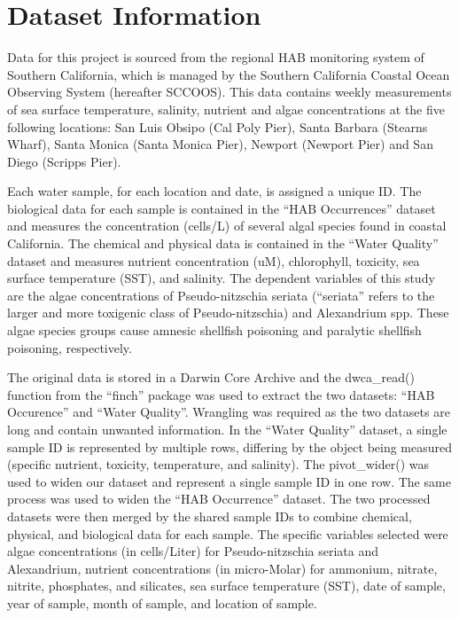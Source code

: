 \documentclass[
  12pt,
]{article}
\begin{document}
\newpage

\hypertarget{dataset-information}{%
\section{Dataset Information}\label{dataset-information}}

Data for this project is sourced from the regional HAB monitoring system
of Southern California, which is managed by the Southern California
Coastal Ocean Observing System (hereafter SCCOOS). This data contains
weekly measurements of sea surface temperature, salinity, nutrient and
algae concentrations at the five following locations: San Luis Obsipo
(Cal Poly Pier), Santa Barbara (Stearns Wharf), Santa Monica (Santa
Monica Pier), Newport (Newport Pier) and San Diego (Scripps Pier).

Each water sample, for each location and date, is assigned a unique ID.
The biological data for each sample is contained in the ``HAB
Occurrences'' dataset and measures the concentration (cells/L) of
several algal species found in coastal California. The chemical and
physical data is contained in the ``Water Quality'' dataset and measures
nutrient concentration (uM), chlorophyll, toxicity, sea surface
temperature (SST), and salinity. The dependent variables of this study
are the algae concentrations of Pseudo-nitzschia seriata (``seriata''
refers to the larger and more toxigenic class of Pseudo-nitzschia) and
Alexandrium spp. These algae species groups cause amnesic shellfish
poisoning and paralytic shellfish poisoning, respectively.

The original data is stored in a Darwin Core Archive and the
dwca\_read() function from the ``finch'' package was used to extract the
two datasets: ``HAB Occurence'' and ``Water Quality''. Wrangling was
required as the two datasets are long and contain unwanted information.
In the ``Water Quality'' dataset, a single sample ID is represented by
multiple rows, differing by the object being measured (specific
nutrient, toxicity, temperature, and salinity). The pivot\_wider() was
used to widen our dataset and represent a single sample ID in one row.
The same process was used to widen the ``HAB Occurrence'' dataset. The
two processed datasets were then merged by the shared sample IDs to
combine chemical, physical, and biological data for each sample. The
specific variables selected were algae concentrations (in cells/Liter)
for Pseudo-nitzschia seriata and Alexandrium, nutrient concentrations
(in micro-Molar) for ammonium, nitrate, nitrite, phosphates, and
silicates, sea surface temperature (SST), date of sample, year of
sample, month of sample, and location of sample.
\end{document}
